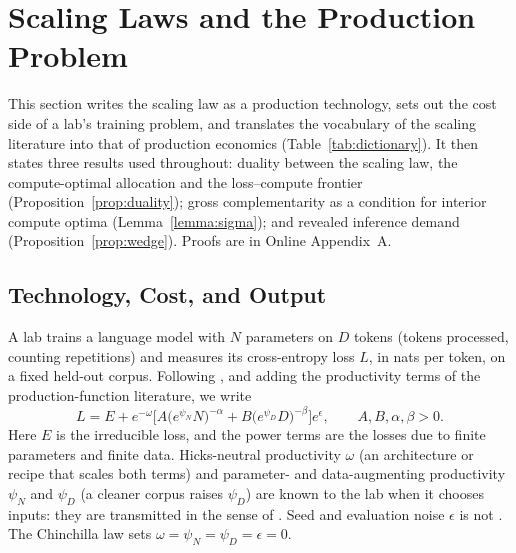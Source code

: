 
\section{Scaling Laws and the Production Problem}\label{sec:framework}

This section writes the scaling law as a production technology, sets out the cost side of a lab's training problem,
and translates the vocabulary of the scaling literature into that of production economics
(Table~\ref{tab:dictionary}). It then states three results used throughout: duality between the scaling law, the
compute-optimal allocation and the loss--compute frontier (Proposition~\ref{prop:duality}); gross complementarity as
a condition for interior compute optima (Lemma~\ref{lemma:sigma}); and revealed inference demand
(Proposition~\ref{prop:wedge}). Proofs are in Online Appendix~A.

\subsection{Technology, Cost, and Output}\label{sec:framework:tech}

A lab trains a language model with $N$ parameters on $D$ tokens (tokens processed, counting repetitions) and
measures its cross-entropy loss $L$, in nats per token, on a fixed held-out corpus. Following
\citet{hoffmann2022training}, and adding the productivity terms of the production-function literature, we write
\begin{equation}\label{eq:tech}
L=E+e^{-\omega}\Big[A\big(e^{\psi_N}N\big)^{-\alpha}+B\big(e^{\psi_D}D\big)^{-\beta}\Big]e^{\epsilon},
\qquad A,B,\alpha,\beta>0 .
\end{equation}
Here $E$ is the irreducible loss, and the power terms are the losses due to finite parameters and finite data.
Hicks-neutral productivity $\omega$ (an architecture or recipe that scales both terms) and parameter- and
data-augmenting productivity $\psi_N$ and $\psi_D$ (a cleaner corpus raises $\psi_D$) are known to the lab when it
chooses inputs: they are transmitted in the sense of \citet{marschak1944random}. Seed and evaluation noise $\epsilon$
is not \citep{zellner1966specification}. The Chinchilla law sets $\omega=\psi_N=\psi_D=\epsilon=0$.


